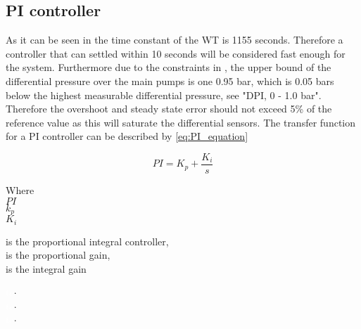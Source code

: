 \vspace{-0.5cm}




\subsection*{PI controller}

As it can be seen in  the time constant of the WT is 1155 seconds. Therefore a controller that can settled within 10 seconds will be considered fast enough for the system.
Furthermore due to the constraints in , the upper bound of the differential pressure over the main pumps is one 0.95 bar, which is 0.05 bars below the highest measurable differential pressure, see \citep{grunnn_psi_diff} "DPI, 0 - 1.0 bar". Therefore the overshoot and steady state error should not exceed 5\% of the reference value as this will saturate the differential sensors.
The transfer function for a PI controller can be described by \eqref{eq:PI_equation}

\begin{equation}
	PI = K_p + \frac{K_i}{s}
	\label{eq:PI_equation}
\end{equation}

\begin{minipage}[t]{0.20\textwidth}
Where\\
\hspace*{8mm} $ PI $ \\
\hspace*{8mm} $ k_p $  \\
\hspace*{8mm} $ K_i $  
\end{minipage}
\begin{minipage}[t]{0.68\textwidth}
\vspace*{2mm}
is the proportional integral controller, \\
is the proportional gain, \\
is the integral gain
\end{minipage}
\begin{minipage}[t]{0.10\textwidth}
\vspace*{1.8mm}
\textcolor{White}{te}$\unit{\cdot}$\\
\textcolor{White}{te}$\unit{\cdot}$\\
\textcolor{White}{te}$\unit{\cdot}$
\end{minipage}

